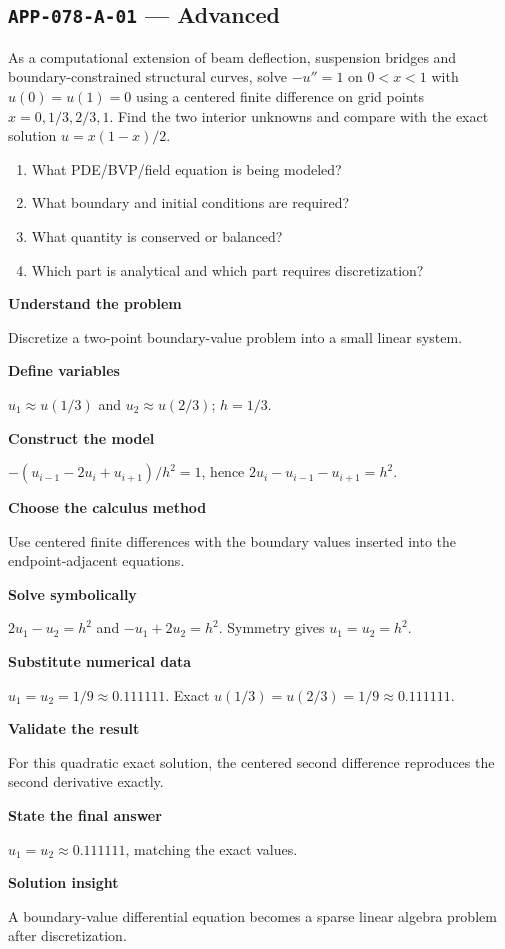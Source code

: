 \documentclass[11pt]{book}
\newcommand{\pid}[1]{\texttt{#1}}
\begin{document}
\subsection*{\pid{APP-078-A-01} — Advanced}
\begin{problembox}
As a computational extension of beam deflection, suspension bridges and boundary-constrained structural curves, solve $-u''=1$ on $0<x<1$ with $u(0)=u(1)=0$ using a centered finite difference on grid points $x=0,1/3,2/3,1$. Find the two interior unknowns and compare with the exact solution $u=x(1-x)/2$.
\end{problembox}
\begin{promptbox}\begin{enumerate}
\item What PDE/BVP/field equation is being modeled?
\item What boundary and initial conditions are required?
\item What quantity is conserved or balanced?
\item Which part is analytical and which part requires discretization?
\end{enumerate}\end{promptbox}
\begin{solutionbox}
\textbf{Understand the problem}\par Discretize a two-point boundary-value problem into a small linear system.\par\medskip
\textbf{Define variables}\par $u_1\approx u(1/3)$ and $u_2\approx u(2/3)$; $h=1/3$.\par\medskip
\textbf{Construct the model}\par $-(u_{i-1}-2u_i+u_{i+1})/h^2=1$, hence $2u_i-u_{i-1}-u_{i+1}=h^2$.\par\medskip
\textbf{Choose the calculus method}\par Use centered finite differences with the boundary values inserted into the endpoint-adjacent equations.\par\medskip
\textbf{Solve symbolically}\par $2u_1-u_2=h^2$ and $-u_1+2u_2=h^2$. Symmetry gives $u_1=u_2=h^2$.\par\medskip
\textbf{Substitute numerical data}\par $u_1=u_2=1/9\approx 0.111111$. Exact $u(1/3)=u(2/3)=1/9\approx 0.111111$.\par\medskip
\textbf{Validate the result}\par For this quadratic exact solution, the centered second difference reproduces the second derivative exactly.\par\medskip
\textbf{State the final answer}\par $u_1=u_2\approx 0.111111$, matching the exact values.\par\medskip
\textbf{Solution insight}\par A boundary-value differential equation becomes a sparse linear algebra problem after discretization.\par\medskip
\end{solutionbox}
\end{document}
